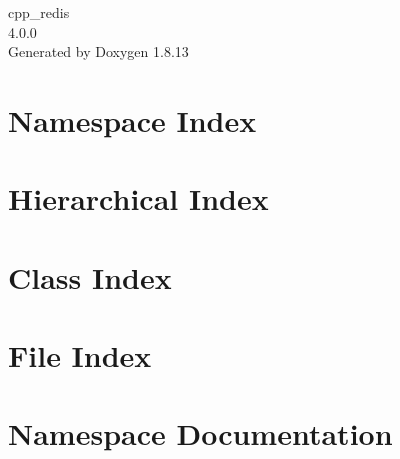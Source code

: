 \documentclass[twoside]{book}
\newcommand{\+}{\discretionary{\mbox{\scriptsize$\hookleftarrow$}}{}{}}
\newcommand{\clearemptydoublepage}{%
  \newpage{\pagestyle{empty}\cleardoublepage}%
}
\begin{document}
\hypersetup{pageanchor=false,
             bookmarksnumbered=true,
             pdfencoding=unicode
            }
\begin{titlepage}
\vspace*{7cm}
\begin{center}%
{\Large cpp\+\_\+redis \\[1ex]\large 4.\+0.\+0 }\\
\vspace*{1cm}
{\large Generated by Doxygen 1.8.13}\\
\end{center}
\end{titlepage}
\clearemptydoublepage
{}
\tableofcontents
\clearemptydoublepage
{}
\hypersetup{pageanchor=true}

\chapter{Namespace Index}

\chapter{Hierarchical Index}

\chapter{Class Index}

\chapter{File Index}

\chapter{Namespace Documentation}




\end{document}
